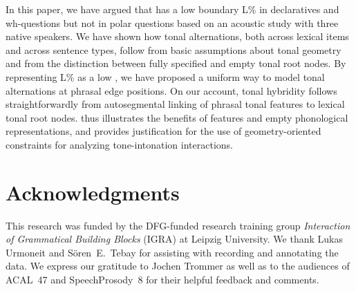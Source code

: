 \documentclass[output=paper,newtxmath,modfonts,nonflat,hidelinks]{langsci/langscibook}
\begin{document}
In this paper, we have argued that  has a  low boundary  L\% in declaratives and wh-questions but not in polar questions based on an acoustic study with three native speakers.
We have shown how tonal alternations, both across lexical items and across sentence types, follow from basic assumptions about tonal geometry and from the distinction between fully specified and empty tonal root nodes.
By representing L\% as a low ,  we have proposed a uniform way to model tonal alternations at phrasal edge positions.
On our account, tonal hybridity follows straightforwardly from autosegmental linking of phrasal tonal features to lexical tonal root nodes.
 thus illustrates the benefits of  features and empty phonological representations, and provides justification for the use of geometry-oriented constraints for analyzing tone-intonation interactions.


\section*{\textbf{Acknowledgments}}

This research was funded by the DFG-funded research training group \textit{Interaction of Grammatical Building Blocks} (IGRA) at Leipzig University. We thank Lukas Urmoneit and S\"{o}ren~E.~Tebay for assisting with recording and annotating the data. We express our gratitude to Jochen Trommer as well as to the audiences of ACAL~47 and SpeechProsody~8 for their helpful feedback and comments.

\sloppy
\printbibliography[heading=subbibliography,notkeyword=this]
\end{document}
